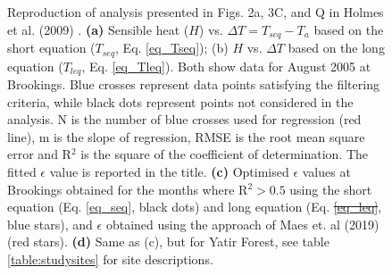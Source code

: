 \documentclass[fleqn,10pt]{wlscirep}
\providecommand{\DIFaddtex}[1]{{\protect\color{blue}\uwave{#1}}} %
\providecommand{\DIFdeltex}[1]{{\protect\color{red}\sout{#1}}}                      %
\providecommand{\DIFaddFL}[1]{\DIFadd{#1}} %
\providecommand{\DIFdelFL}[1]{\DIFdel{#1}} %
\providecommand{\DIFaddbeginFL}{} %
\providecommand{\DIFaddendFL}{} %
\providecommand{\DIFdelbeginFL}{} %
\providecommand{\DIFdelendFL}{} %
\providecommand{\DIFadd}[1]{\texorpdfstring{\DIFaddtex{#1}}{#1}} %
\providecommand{\DIFdel}[1]{\texorpdfstring{\DIFdeltex{#1}}{}} %
\begin{document}
\begin{figure}[h!]
	\caption{Reproduction of analysis presented in Figs. 2a, 3C, and Q in Holmes et al. (2009) \cite{holmes2009land}. \textbf{(a)} Sensible heat ($H$) vs. $\Delta T = T_{seq} - T_{a}$ based on the short equation ($T_{seq}$, Eq. \DIFaddbeginFL \DIFaddFL{(}\DIFaddendFL \ref{eq_Tseq})\DIFaddbeginFL \DIFaddFL{)}\DIFaddendFL ; (b) $H$ vs. $\Delta T$ based on the long equation ($T_{leq}$, Eq. \ref{eq_Tleq}). Both show data for August 2005 at Brookings. Blue crosses represent data points satisfying the filtering criteria, while black dots represent points not considered in the analysis. N is the number of blue crosses used for regression (red line), m is the slope of regression, RMSE is the root mean square error and R$^{2}$ is the square of the coefficient of determination. The fitted $\epsilon$ value is reported in the title. \textbf{(c)} Optimised $\epsilon$ values at Brookings obtained for the months where  R$^{2} > 0.5$ using the short equation (Eq. \ref{eq_seq}, black dots) and long equation (Eq. \DIFdelbeginFL \DIFdelFL{\ref{eq_leq}}\DIFdelendFL \DIFaddbeginFL \DIFaddFL{\ref{eq_Tleq}}\DIFaddendFL , blue stars), and $\epsilon$ obtained using the approach of Maes et. al (2019)\cite{maes2019potential}  (red stars).  \textbf{(d)} Same as (c), but for Yatir Forest, see table \ref{table:studysites} for site descriptions.}
	\label{fig:HDT}
\end{figure}
\end{document}

